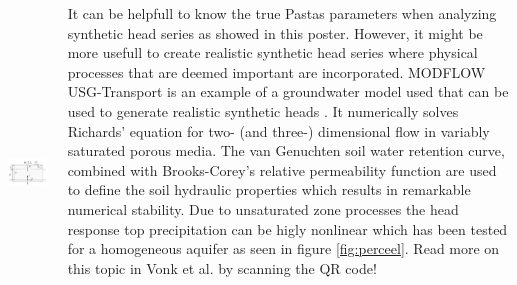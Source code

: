\documentclass[17pt, a0paper, margin=0mm, innermargin=5mm, blockverticalspace=5mm, colspace=5mm, subcolspace=-15mm]{tikzposter}
\begin{document}
\begin{columns}
{
{
\begin{minipage}{0.15\linewidth}
    \begin{tikzfigure}\label{fig:perceel}
        \vspace{-2mm}
        \includegraphics[width=\textwidth, height=3.5in, keepaspectratio]{fig/tikz_perceel.png}
    \end{tikzfigure}
\end{minipage}
\hfill
\begin{minipage}{0.7\linewidth}
    \begin{multicols}{2}
        It can be helpfull to know the true Pastas parameters when analyzing synthetic head series as showed in this poster. However, it might be more usefull to create realistic synthetic head series where physical processes that are deemed important are incorporated. MODFLOW USG-Transport \citep{MFUSG} is an example of a groundwater model used that can be used to generate realistic synthetic heads \citep{Vonk2024}. It numerically solves Richards' equation for two- (and three-) dimensional flow in variably saturated porous media. The van Genuchten soil water retention curve, combined with Brooks-Corey's relative permeability function are used to define the soil hydraulic properties which results in remarkable numerical stability. Due to unsaturated zone processes the head response top precipitation can be higly nonlinear which has been tested for a homogeneous aquifer as seen in figure \ref{fig:perceel}. Read more on this topic in Vonk et al. \citep{Vonk2024} by scanning the QR code!
    \end{multicols}

\end{minipage}}}
\end{columns}
\end{document}
